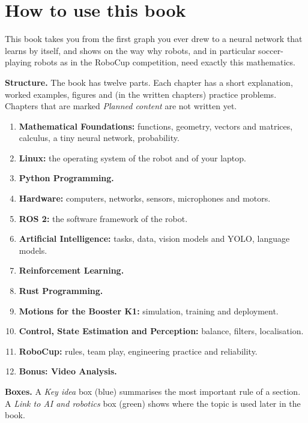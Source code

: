 \documentclass[11pt,a4paper,twoside]{book}
\begin{document}
\frontmatter
\makebooktitle
\cleardoublepage
\tableofcontents

\chapter*{How to use this book}

This book takes you from the first graph you ever drew to a neural network that learns by itself, and shows on the way why robots, and in particular soccer-playing robots as in the RoboCup competition, need exactly this mathematics.

\textbf{Structure.} The book has twelve parts. Each chapter has a short explanation, worked examples, figures and (in the written chapters) practice problems. Chapters that are marked \emph{Planned content} are not written yet.
\begin{enumerate}[nosep,label=\textbf{Part~\Roman*:},leftmargin=4.2em]
  \item \textbf{Mathematical Foundations:} functions, geometry, vectors and matrices, calculus, a tiny neural network, probability.
  \item \textbf{Linux:} the operating system of the robot and of your laptop.
  \item \textbf{Python Programming.}
  \item \textbf{Hardware:} computers, networks, sensors, microphones and motors.
  \item \textbf{ROS 2:} the software framework of the robot.
  \item \textbf{Artificial Intelligence:} tasks, data, vision models and YOLO, language models.
  \item \textbf{Reinforcement Learning.}
  \item \textbf{Rust Programming.}
  \item \textbf{Motions for the Booster K1:} simulation, training and deployment.
  \item \textbf{Control, State Estimation and Perception:} balance, filters, localisation.
  \item \textbf{RoboCup:} rules, team play, engineering practice and reliability.
  \item \textbf{Bonus: Video Analysis.}
\end{enumerate}

\textbf{Boxes.} A \emph{Key idea} box (blue) summarises the most important rule of a section. A \emph{Link to AI and robotics} box (green) shows where the topic is used later in the book.
\end{document}
